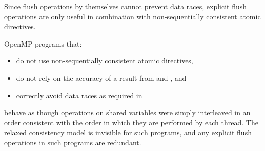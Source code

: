 \begin{note}
Since flush operations by themselves cannot prevent data races, explicit flush
operations are only useful in combination with non-sequentially consistent atomic
directives.
\end{note}

OpenMP programs that:

\begin{itemize}[rightmargin=11ex]
\item do not use non-sequentially consistent atomic directives,

\item do not rely on the accuracy of a  result from
 and , and

\item correctly avoid data races as required in 
\end{itemize}

behave as though operations on shared variables were simply interleaved in an order
consistent with the order in which they are performed by each thread. The relaxed
consistency model is invisible for such programs, and any explicit flush operations in
such programs are redundant.
